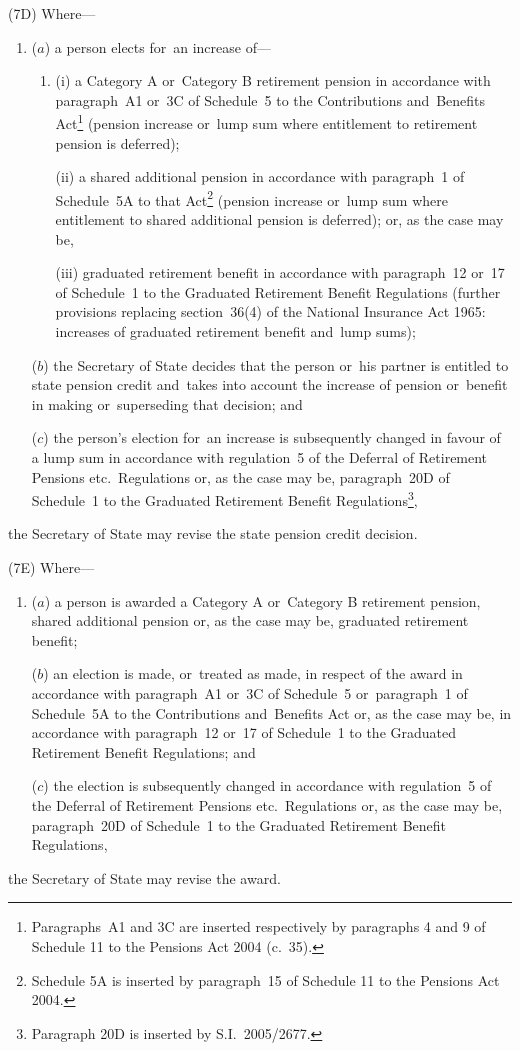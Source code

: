 \documentclass[12pt,a4paper]{article}
\begin{document}
(7D) Where—
\begin{enumerate}\item[]
($a$) a person elects for~an increase of—
\begin{enumerate}\item[]
(i) a Category A or~Category B retirement pension in accordance with paragraph~A1 or~3C of Schedule~5 to the Contributions and~Benefits Act\footnote{Paragraphs~A1 and 3C are inserted respectively by paragraphs 4 and 9 of Schedule 11 to the Pensions Act 2004 (c.~35).} (pension increase or~lump sum where entitlement to retirement pension is deferred);

(ii) a shared additional pension in accordance with paragraph~1 of Schedule~5A to that Act\footnote{Schedule 5A is inserted by paragraph~15 of Schedule 11 to the Pensions Act 2004.} (pension increase or~lump sum where entitlement to shared additional pension is deferred); or, as the case may be,

(iii) graduated retirement benefit in accordance with paragraph~12 or~17 of Schedule~1 to the Graduated Retirement Benefit Regulations (further provisions replacing section~36(4) of the National Insurance Act 1965: increases of graduated retirement benefit and~lump sums);\end{enumerate}

($b$) the Secretary of State decides that the person or~his partner is entitled to state pension credit and~takes into account the increase of pension or~benefit in making or~superseding that decision; and

($c$) the person’s election for~an increase is subsequently changed in favour of a lump sum in accordance with regulation~5 of the Deferral of Retirement Pensions etc.\ Regulations or, as the case may be, paragraph~20D of Schedule~1 to the Graduated Retirement Benefit Regulations\footnote{Paragraph 20D is inserted by S.I.~2005/2677.},
\end{enumerate}
the Secretary of State may revise the state pension credit decision.

(7E) Where—
\begin{enumerate}\item[]
($a$) a person is awarded a Category A or~Category B retirement pension, shared additional pension or, as the case may be, graduated retirement benefit;

($b$) an election is made, or~treated as made, in respect of the award in accordance with paragraph~A1 or~3C of Schedule~5 or~paragraph~1 of Schedule~5A to the Contributions and~Benefits Act or, as the case may be, in accordance with paragraph~12 or~17 of Schedule~1 to the Graduated Retirement Benefit Regulations; and

($c$) the election is subsequently changed in accordance with regulation~5 of the Deferral of Retirement Pensions etc.\ Regulations or, as the case may be, paragraph~20D of Schedule~1 to the Graduated Retirement Benefit Regulations,
\end{enumerate}
the Secretary of State may revise the award.
\end{document}
